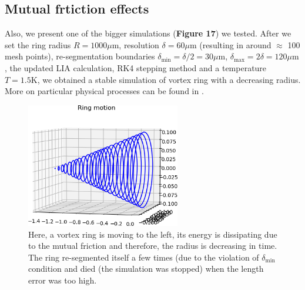 \newpage

\subsection*{Mutual frtiction effects}

Also, we present one of the bigger simulations (\textbf{Figure 17}) we tested. After we set the ring radius $R=1000\mu\text{m}$, resolution $\delta=60\mu\text{m}$ (resulting in around $\approx$ 100 mesh points),
re-segmentation boundaries $\delta_{\text{min}}= \delta /2 = 30\mu\text{m}$, $\delta_{\text{max}} = 2\delta = 120\mu\text{m}$, the updated LIA calculation, RK4 stepping method and a temperature $T=1.5\text{K}$, we obtained a stable simulation of vortex ring with a decreasing radius. More on particular physical processes can be found in \cite{biot_origin}.

\begin{figure}[h]
	\centering
	\includegraphics[width=0.6\textwidth]{graphics/results/ring-motion_full}
	\caption{Here, a vortex ring is moving to the left, its energy is dissipating due to the mutual friction and therefore, the radius is decreasing in time. The ring re-segmented itself a few times (due to the violation of $\delta_{\text{min}}$ condition and died (the simulation was stopped) when the length error was too high.}
\end{figure}

\newpage
